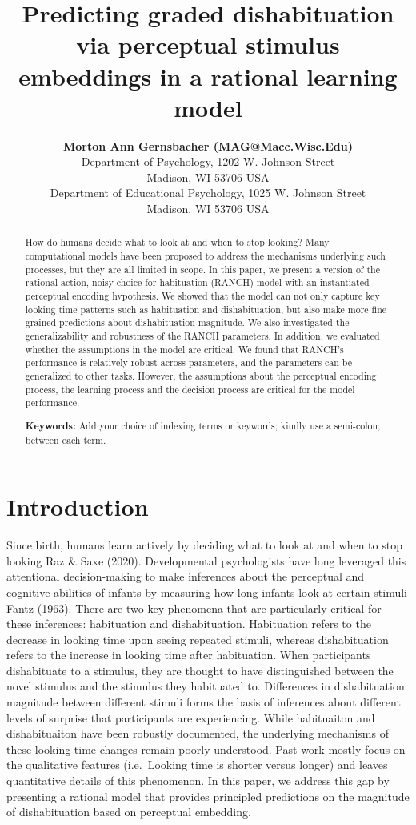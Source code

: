 \documentclass[10pt, letterpaper]{article}
\title{Predicting graded dishabituation via perceptual stimulus
embeddings in a rational learning model}
\author{{\large \bf Morton Ann Gernsbacher (MAG@Macc.Wisc.Edu)} \\ Department of Psychology, 1202 W. Johnson Street \\ Madison, WI 53706 USA \AND {\large \bf Sharon J.~Derry (SDJ@Macc.Wisc.Edu)} \\ Department of Educational Psychology, 1025 W. Johnson Street \\ Madison, WI 53706 USA}
\begin{document}
\maketitle

\begin{abstract}
How do humans decide what to look at and when to stop looking? Many
computational models have been proposed to address the mechanisms
underlying such processes, but they are all limited in scope. In this
paper, we present a version of the rational action, noisy choice for
habituation (RANCH) model with an instantiated perceptual encoding
hypothesis. We showed that the model can not only capture key looking
time patterns such as habituation and dishabituation, but also make more
fine grained predictions about dishabituation magnitude. We also
investigated the generalizability and robustness of the RANCH
parameters. In addition, we evaluated whether the assumptions in the
model are critical. We found that RANCH's performance is relatively
robust across parameters, and the parameters can be generalized to other
tasks. However, the assumptions about the perceptual encoding process,
the learning process and the decision process are critical for the model
performance.

\textbf{Keywords:}
Add your choice of indexing terms or keywords; kindly use a semi-colon;
between each term.
\end{abstract}

\hypertarget{introduction}{%
\section{Introduction}\label{introduction}}

Since birth, humans learn actively by deciding what to look at and when
to stop looking Raz \& Saxe (2020). Developmental psychologists have
long leveraged this attentional decision-making to make inferences about
the perceptual and cognitive abilities of infants by measuring how long
infants look at certain stimuli Fantz (1963). There are two key
phenomena that are particularly critical for these inferences:
habituation and dishabituation. Habituation refers to the decrease in
looking time upon seeing repeated stimuli, whereas dishabituation refers
to the increase in looking time after habituation. When participants
dishabituate to a stimulus, they are thought to have distinguished
between the novel stimulus and the stimulus they habituated to.
Differences in dishabituation magnitude between different stimuli forms
the basis of inferences about different levels of surprise that
participants are experiencing. While habituaiton and dishabituaiton have
been robustly documented, the underlying mechanisms of these looking
time changes remain poorly understood. Past work mostly focus on the
qualitative features (i.e.~Looking time is shorter versus longer) and
leaves quantitative details of this phenomenon. In this paper, we
address this gap by presenting a rational model that provides principled
predictions on the magnitude of dishabituation based on perceptual
embedding.
\end{document}
